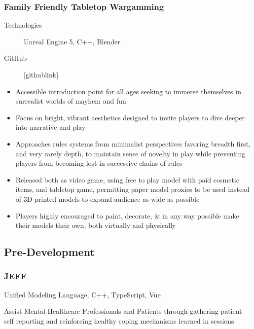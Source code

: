 \documentclass[10pt]{article} %
\begin{document}
\subsubsection{Family Friendly Tabletop Wargamming}
\begin{description}
    \item[Technologies] {Unreal Engine 5, C++, Blender}
    \item[GitHub] {[githublink]}
\end{description}
\begin{itemize}
    \item {Accessible introduction point for all ages seeking to immerse themselves
        in surrealist worlds of mayhem and fun}
    \item {Focus on bright, vibrant aesthetics designed to invite players to dive 
        deeper into narrative and play}
    \item {Approaches rules systems from minimalist perspectives favoring breadth 
        first, and very rarely depth, to maintain sense of novelty in play while 
        preventing players from becoming lost in successive chains of rules}
    \item {Released both as video game, using free to play model with paid 
        cosmetic items, and tabletop game, permitting paper model proxies to be 
        used instead of 3D printed models to expand audience as wide as possible}
    \item {Players highly encouraged to paint, decorate, \& in any way possible make 
        their models their own, both virtually and physically}
\end{itemize}

\subsection{Pre-Development}
\subsubsection{JEFF}
\begin{description}[style=multiline, leftmargin=2.75cm]
    \item[Technologies] {Unified Modeling Language, C++, TypeScript, Vue}
    \item[Purpose] {Assist Mental Healthcare Professionals and Patients 
        through gathering patient \\ self reporting and reinforcing healthy 
        coping mechanisms learned in sessions}  
\end{description}
\pagebreak
\end{document}
